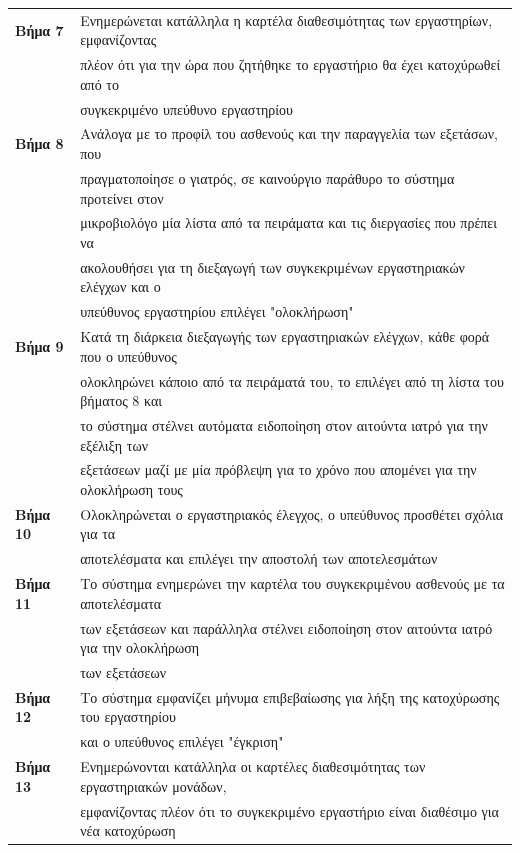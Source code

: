 \documentclass{article}
\newcommand\T{\rule{0pt}{2.6ex}}       %
\newcommand\B{\rule[-1.2ex]{0pt}{0pt}}
\begin{document}
\begin{center}
\begin{tabular}{|l|l|}
      \hline
      \textbf{Βήμα 7} & Ενημερώνεται κατάλληλα η καρτέλα διαθεσιμότητας των εργαστηρίων, εμφανίζοντας\T\\& πλέον ότι για την ώρα που ζητήθηκε το εργαστήριο θα έχει κατοχύρωθεί από το \\&  συγκεκριμένο υπεύθυνο εργαστηρίου\B \\
      \hline
      \textbf{Βήμα 8} &  Ανάλογα με το προφίλ του ασθενούς και την παραγγελία των εξετάσων, που \T\\& πραγματοποίησε ο γιατρός, σε καινούργιο παράθυρο το σύστημα προτείνει στον \\& μικροβιολόγο μία λίστα από τα πειράματα και τις διεργασίες που πρέπει να \\& ακολουθήσει για τη διεξαγωγή των συγκεκριμένων εργαστηριακών ελέγχων και ο \\& υπεύθυνος εργαστηρίου επιλέγει "ολοκλήρωση"\B \\
      \hline
      \textbf{Βήμα 9} & Κατά τη διάρκεια διεξαγωγής των εργαστηριακών ελέγχων, κάθε φορά που ο υπεύθυνος \T\\& ολοκληρώνει κάποιο από τα πειράματά του, το επιλέγει από τη λίστα του βήματος 8  και \\& το σύστημα στέλνει αυτόματα ειδοποίηση στον αιτούντα ιατρό για την εξέλιξη των \\& εξετάσεων μαζί με μία πρόβλεψη για το χρόνο που απομένει για την ολοκλήρωση τους \B \\
      \hline
      \textbf{Βήμα 10} & Ολοκληρώνεται ο εργαστηριακός έλεγχος, ο υπεύθυνος προσθέτει σχόλια για τα \T\\& αποτελέσματα και επιλέγει την αποστολή των αποτελεσμάτων\B \\
      \hline
      \textbf{Βήμα 11} & Το σύστημα ενημερώνει την καρτέλα του συγκεκριμένου ασθενούς με τα αποτελέσματα\T\\& των εξετάσεων και παράλληλα στέλνει ειδοποίηση στον αιτούντα ιατρό για την ολοκλήρωση \\& των εξετάσεων \B \\
      \hline
      \textbf{Βήμα 12} & Το σύστημα εμφανίζει μήνυμα επιβεβαίωσης για λήξη της κατοχύρωσης του εργαστηρίου \T\\& και ο υπεύθυνος επιλέγει "έγκριση"\B \\
      \hline
      \textbf{Βήμα 13} & Ενημερώνονται κατάλληλα οι καρτέλες διαθεσιμότητας των εργαστηριακών μονάδων,\T\\& εμφανίζοντας πλέον ότι το συγκεκριμένο εργαστήριο είναι διαθέσιμο για νέα κατοχύρωση\B \\
      \hline
     \end{tabular}
 \end{center}
 
\end{document}
